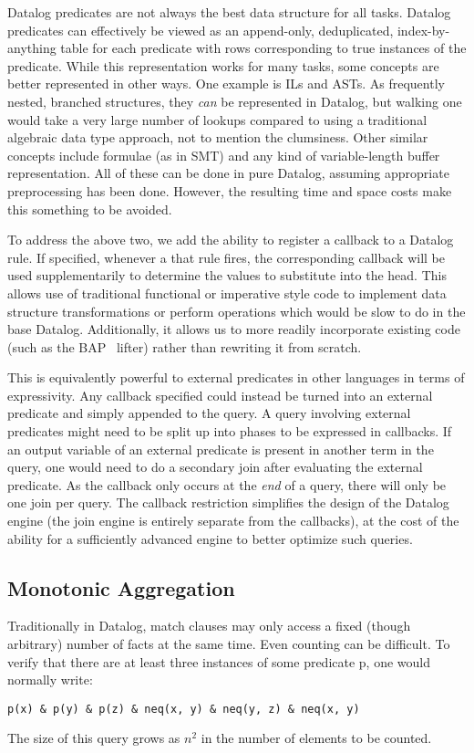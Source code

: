 Datalog predicates are not always the best data structure for all tasks.
Datalog predicates can effectively be viewed as an append-only, deduplicated, index-by-anything table for each predicate with rows corresponding to true instances of the predicate.
While this representation works for many tasks, some concepts are better represented in other ways.
One example is ILs and ASTs.
As frequently nested, branched structures, they \emph{can} be represented in Datalog, but walking one would take a very large number of lookups compared to using a traditional algebraic data type approach, not to mention the clumsiness.
Other similar concepts include formulae (as in SMT) and any kind of variable-length buffer representation.
All of these can be done in pure Datalog, assuming appropriate preprocessing has been done.
However, the resulting time and space costs make this something to be avoided.

To address the above two, we add the ability to register a callback to a Datalog rule.
If specified, whenever a that rule fires, the corresponding callback will be used supplementarily to determine the values to substitute into the head.
This allows use of traditional functional or imperative style code to implement data structure transformations or perform operations which would be slow to do in the base Datalog.
Additionally, it allows us to more readily incorporate existing code (such as the BAP~\cite{bap} lifter) rather than rewriting it from scratch.

This is equivalently powerful to external predicates in other languages in terms of expressivity.
Any callback specified could instead be turned into an external predicate and simply appended to the query.
A query involving external predicates might need to be split up into phases to be expressed in callbacks.
If an output variable of an external predicate is present in another term in the query, one would need to do a secondary join after evaluating the external predicate.
As the callback only occurs at the \emph{end} of a query, there will only be one join per query.
The callback restriction simplifies the design of the Datalog engine (the join engine is entirely separate from the callbacks), at the cost of the ability for a sufficiently advanced engine to better optimize such queries.

\subsection{Monotonic Aggregation}
Traditionally in Datalog, match clauses may only access a fixed (though arbitrary) number of facts at the same time.
Even counting can be difficult.
To verify that there are at least three instances of some predicate p, one would normally write:
\begin{verbatim}
p(x) & p(y) & p(z) & neq(x, y) & neq(y, z) & neq(x, y)
\end{verbatim}
The size of this query grows as $n^2$ in the number of elements to be counted.

